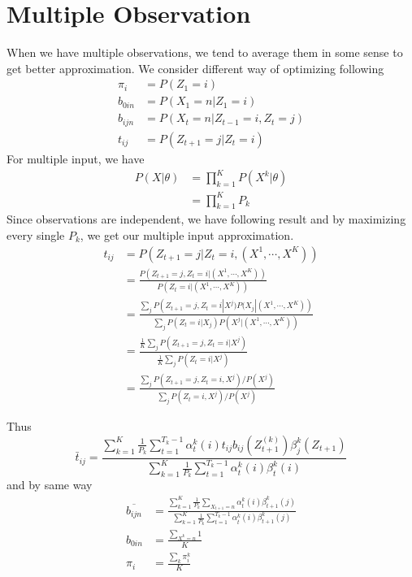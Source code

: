 \documentclass{article}
\begin{document}
\section{Multiple Observation}

When we have multiple observations, we tend to average them in some sense to get better approximation. We consider different way of optimizing following
$$
\begin{aligned}
\pi_{i}&=P\left(Z_{1}=i\right)\\
b_{0i n}&=P\left(X_{1}=n | Z_{1}=i\right)\\
b_{i j n}&=P\left(X_{t}=n | Z_{t-1}=i, Z_{t}=j\right)\\
t_{i j}&=P\left(Z_{t+1}=j | Z_{t}=i\right)
\end{aligned}
$$
For multiple input, we have 
$$
\begin{aligned} P(X | \theta) &=\prod_{k=1}^{K} P\left(X^{k} | \theta \right) \\ &=\prod_{k=1}^{K} P_{k} \end{aligned}
$$
Since observations are independent, we have following result and by maximizing every single $P_k$, we get our multiple input approximation.
$$
\begin{aligned}
t_{i j}&=P\left(Z_{t+1}=j | Z_{t}=i, (X^1, \cdots, X^K)\right)\\
&=\frac{P\left(Z_{t+1}=j  , Z_{t}=i |(X^1, \cdots, X^K)\right)}{P(Z_t=i | (X^1, \cdots, X^K) )}\\
&=\frac{\sum_j P\left(Z_{t+1}=j  , Z_{t}=i | X^j)P(X_j| (X^1, \cdots, X^K)\right)}{\sum_j P(Z_t=i | X_j)P(X^j| (X^1, \cdots, X^K) )}\\
&=\frac{\frac{1}{K} \sum_j P(Z_{t+1}=j  , Z_{t}=i | X^j)}{\frac{1}{K} \sum_j P(Z_t=i | X^j)}\\
&=\frac{ \sum_j P(Z_{t+1}=j  , Z_{t}=i ,X^j) /P(X^j)}{ \sum_j P(Z_t=i ,X^j) /P(X^j)}
\end{aligned}
$$

Thus 
$$
\bar{t}_{i j}=\frac{\sum_{k=1}^{K} \frac{1}{P_{k}} \sum_{t=1}^{T_{k}-1} \alpha_{t}^{k}(i) t_{i j} b_{ij}\left(Z_{t+1}^{(k)}\right) \beta_{j}^{k}(Z_{t+1})}{\sum_{k=1}^{K} \frac{1}{P_{k}} \sum_{t=1}^{T_{k}-1} \alpha_{t}^{k}(i) \beta_{t}^{k}(i)}
$$
and by same way
$$
\begin{aligned}
\overline{b_{ijn}}&=\frac{\sum_{k=1}^{K} \frac{1}{P_{k}} \sum_{X_{t+1}=n}\alpha_{t}^{k}(i) \beta_{t+1}^{k}(j)}{\sum_{k=1}^{K} \frac{1}{P_{k}} \sum_{t=1}^{T_{k}-1} \alpha_{t}^{k}(i) \beta_{t+1}^{k}(j)}\\
b_{0in}&=\frac{\sum_{X^k=n} 1}{K}\\
\pi_i&=\frac{\sum_k \pi^k_i}{K}
\end{aligned}
$$
\end{document}
